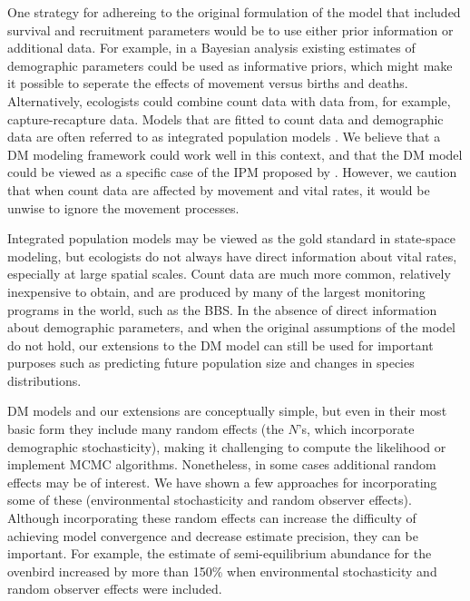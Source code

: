 \documentclass[12pt,english]{article}
\begin{document}
\begin{spacing}{1.9}
\begin{flushleft}
One strategy for adhereing to the original formulation of the
model that included survival and recruitment parameters would be to
use either prior information or additional data. For example, in a
Bayesian analysis existing estimates of demographic parameters
could be used as informative priors, which might make it possible to
seperate the effects of movement versus births and deaths.
Alternatively, ecologists could combine count data with data
from, for example,
capture-recapture data. Models that are fitted to count data and
demographic data are often referred to as integrated population models
\citep[IPM;][]{besbeas_etal:2002,
buckland_etal:2004,schaub_etal:2007}.
We believe that a DM modeling framework could work well in this context,
and that the DM model could be viewed as a specific case of the
IPM proposed by \citet{buckland_etal:2004}.
However, we caution that when count data are affected by
movement and vital rates, it would be unwise to ignore the movement
processes.


Integrated population models may be viewed as the gold standard in
state-space modeling, but ecologists do not always have direct
information about vital rates, especially at large spatial scales.
Count data are much more common, relatively inexpensive to obtain, and
are produced by many of the largest monitoring programs in the
world, such as the BBS. %
In the absence of direct information about demographic parameters, and
when the original assumptions of the model do not hold, our extensions to the
DM model can still be used for important purposes such as predicting future
population size and changes in species distributions.

DM models and our extensions are conceptually simple, but even in
their most basic form they include many random effects (the $N$'s, which
incorporate demographic stochasticity), making it challenging to compute the likelihood 
or implement MCMC algorithms. Nonetheless, in some cases additional random effects
may be of interest.  We have shown a few approaches for incorporating some of these
(environmental stochasticity and random observer effects).  %
Although incorporating these random effects can increase
the difficulty of achieving model convergence and decrease estimate precision, they can be important.
For example, the estimate of semi-equilibrium abundance for the ovenbird increased by more than 150\%
when environmental stochasticity and random observer effects were included.  


\end{flushleft}
\end{spacing}
\end{document}
